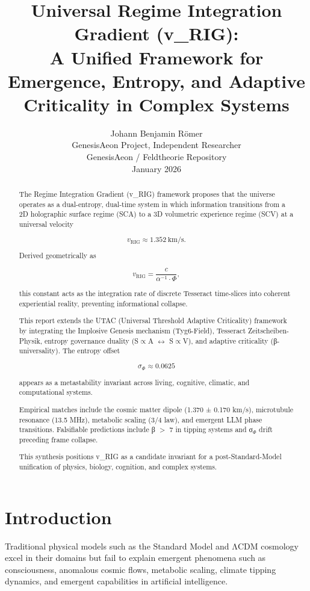 \documentclass[11pt,a4paper]{article}
\title{
\textbf{Universal Regime Integration Gradient (v\_RIG):\\
A Unified Framework for Emergence, Entropy, and Adaptive Criticality in Complex Systems}
}
\author{
Johann Benjamin Römer\\
\small GenesisAeon Project, Independent Researcher\\
\small GenesisAeon / Feldtheorie Repository\\
\small January 2026
}
\date{}
\begin{document}
\maketitle

\begin{abstract}
The Regime Integration Gradient (v\_RIG) framework proposes that the universe operates as a dual-entropy, dual-time system in which information transitions from a 2D holographic surface regime (SCA) to a 3D volumetric experience regime (SCV) at a universal velocity


\[
v_{\text{RIG}} \approx 1.352~\text{km/s}.
\]


Derived geometrically as


\[
v_{\text{RIG}} = \frac{c}{\alpha^{-1} \cdot \Phi},
\]


this constant acts as the integration rate of discrete Tesseract time-slices into coherent experiential reality, preventing informational collapse.

This report extends the UTAC (Universal Threshold Adaptive Criticality) framework by integrating the Implosive Genesis mechanism (Tyg6-Field), Tesseract Zeitscheiben-Physik, entropy governance duality (S\(\propto\)A $\leftrightarrow$ S\(\propto\)V), and adaptive criticality (β-universality). The entropy offset


\[
\sigma_{\Phi} \approx 0.0625
\]


appears as a metastability invariant across living, cognitive, climatic, and computational systems.

Empirical matches include the cosmic matter dipole (1.370 ± 0.170 km/s), microtubule resonance (13.5 MHz), metabolic scaling (3/4 law), and emergent LLM phase transitions. Falsifiable predictions include β $>$ 7 in tipping systems and σ\(_\Phi\) drift preceding frame collapse.

This synthesis positions v\_RIG as a candidate invariant for a post-Standard-Model unification of physics, biology, cognition, and complex systems.
\end{abstract}

\section{Introduction}

Traditional physical models such as the Standard Model and ΛCDM cosmology excel in their domains but fail to explain emergent phenomena such as consciousness, anomalous cosmic flows, metabolic scaling, climate tipping dynamics, and emergent capabilities in artificial intelligence.
\end{document}
